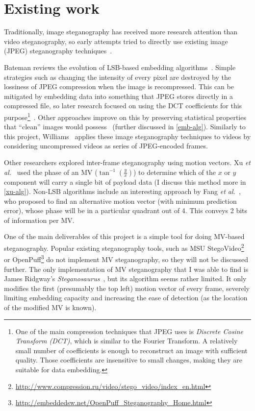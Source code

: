 \documentclass[12pt,british,twoside,notitlepage,usenames,dvipsnames,hypens,final]{report}
\numberwithin{equation}{section}
\numberwithin{figure}{section}
\begin{document}
\section{Existing work}

Traditionally, image steganography has received more research attention than video steganography, so early attempts tried to directly use existing image (JPEG) steganography techniques~\cite{bateman, jpegdctcoding}.

Bateman reviews the evolution of LSB-based embedding algorithms~\cite{bateman}. Simple strategies such as changing the intensity of every pixel are destroyed by the lossiness of JPEG compression when the image is recompressed. This can be mitigated by embedding data into something that JPEG stores directly in a compressed file, so later research focused on using the DCT coefficients for this purpose\footnote{
One of the main compression techniques that JPEG uses is \emph{Discrete Cosine Transform (DCT)}, which is similar to the Fourier Transform. A relatively small number of coefficients is enough to reconstruct an image with sufficient quality. Those coefficients are insensitive to small changes, making they are suitable for data embedding.}~\cite{jpegdctcoding}. Other approaches improve on this by preserving statistical properties that ``clean'' images would possess~\cite{bateman, f5} (further discussed in \ref{emb-alg}). Similarly to this project, Williams~\cite{scott-fs} applies these image steganography techniques to videos by considering uncompressed videos as series of JPEG-encoded frames.

Other researchers explored inter-frame steganography using motion vectors. Xu \emph{et al.}~\cite{xu2006steganography} used the phase of an MV ($\tan^{-1}(\frac{y}{x})$) to determine which of the $x$ or $y$ component will carry a single bit of payload data (I discuss this method more in \ref{xu-alg}). Non-LSB algorithms include an interesting approach by Fang \emph{et al.}~\cite{fang2006data}, who proposed to find an alternative motion vector (with minimum prediction error), whose phase will be in a particular quadrant out of 4. This conveys 2 bits of information per MV.

One of the main deliverables of this project is a simple tool for doing MV-based steganography. Popular existing steganography tools, such as MSU StegoVideo\footnote{\url{http://www.compression.ru/video/stego_video/index_en.html}} or OpenPuff\footnote{\url{http://embeddedsw.net/OpenPuff_Steganography_Home.html}} do not implement MV steganography, so they will not be discussed further. The only implementation of MV steganography that I was able to find is James Ridgway's \emph{Steganosaurus}~\cite{steganosaurus}, but its algorithm seems rather limited. It only modifies the first (presumably the top left) motion vector of every frame, severely limiting embedding capacity and increasing the ease of detection (as the location of the modified MV is known).
\end{document}
